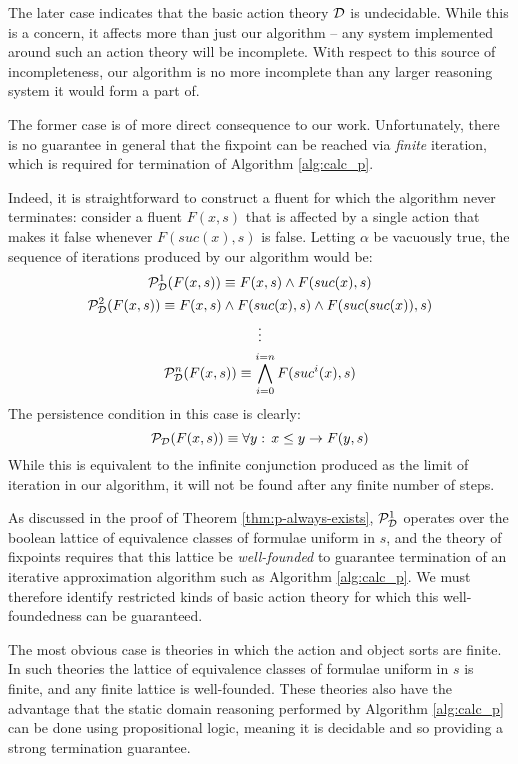 The later case indicates that the basic action theory $\mathcal{D}$ is undecidable.
While this is a concern, it affects more than just our algorithm --
any system implemented around such an action theory will be incomplete.
With respect to this source of incompleteness, our algorithm is no
more incomplete than any larger reasoning system it would form a part
of.

The former case is of more direct consequence to our work. Unfortunately,
there is no guarantee in general that the fixpoint can be reached
via \emph{finite} iteration, which is required for termination of
Algorithm \ref{alg:calc_p}.

Indeed, it is straightforward to construct a fluent for which the
algorithm never terminates: consider a fluent $F(x,s)$ that is affected
by a single action that makes it false whenever $F(suc(x),s)$ is
false. Letting $\alpha$ be vacuously true, the sequence of iterations
produced by our algorithm would be:\begin{gather*}
\mathcal{P}_{\mathcal{D}}^{1}(F(x,s))\equiv F(x,s)\wedge F(suc(x),s)\\
\mathcal{P}_{\mathcal{D}}^{2}(F(x,s))\equiv F(x,s)\wedge F(suc(x),s)\wedge F(suc(suc(x)),s)\\
\vdots\\
\mathcal{P}_{\mathcal{D}}^{n}(F(x,s))\equiv\bigwedge_{i=0}^{i=n}F(suc^{i}(x),s)\end{gather*}
 The persistence condition in this case is clearly: \[
\mathcal{P}_{\mathcal{D}}(F(x,s))\equiv\forall y:\, x\leq y\rightarrow F(y,s)\]
 While this is equivalent to the infinite conjunction produced as
the limit of iteration in our algorithm, it will not be found after
any finite number of steps.

As discussed in the proof of Theorem \ref{thm:p-always-exists}, $\mathcal{P}_{\mathcal{D}}^{1}$
operates over the boolean lattice of equivalence classes of formulae
uniform in $s$, and the theory of fixpoints requires that this lattice
be \emph{well-founded} to guarantee termination of an iterative approximation
algorithm such as Algorithm \ref{alg:calc_p}. We must therefore identify
restricted kinds of basic action theory for which this well-foundedness
can be guaranteed.

The most obvious case is theories in which the action and object sorts
are finite. In such theories the lattice of equivalence classes of
formulae uniform in $s$ is finite, and any finite lattice is well-founded.
These theories also have the advantage that the static domain reasoning
performed by Algorithm \ref{alg:calc_p} can be done using propositional
logic, meaning it is decidable and so providing a strong termination
guarantee.

